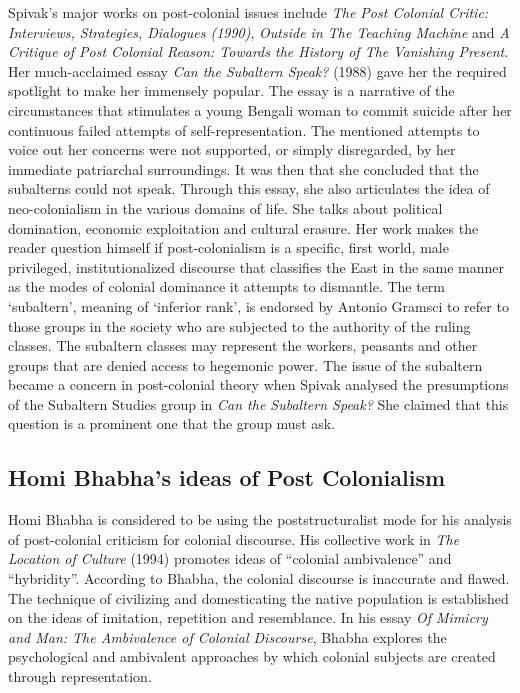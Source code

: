 Spivak’s major works on post-colonial issues include \emph{The Post Colonial Critic: Interviews, Strategies, Dialogues (1990)}, \emph{Outside in The Teaching Machine} and \emph{A Critique of Post Colonial Reason: Towards the History of The Vanishing Present}. Her much-acclaimed essay \emph{Can the Subaltern Speak?} (1988) gave her the required spotlight to make her immensely popular. The essay is a narrative of the circumstances that stimulates a young Bengali woman to commit suicide after her continuous failed attempts of self-representation. The mentioned attempts to voice out her concerns were not supported, or simply disregarded, by her immediate patriarchal surroundings. It was then that she concluded that the subalterns could not speak. Through this essay, she also articulates the idea of neo-colonialism in the various domains of life. She talks about political domination, economic exploitation and cultural erasure. Her work makes the reader question himself if post-colonialism is a specific, first world, male privileged, institutionalized discourse that classifies the East in the same manner as the modes of colonial dominance it attempts to dismantle. The term ‘subaltern’, meaning of ‘inferior rank’, is endorsed by Antonio Gramsci to refer to those groups in the society who are subjected to the authority of the ruling classes. The subaltern classes may represent the workers, peasants and other groups that are denied access to hegemonic power. The issue of the subaltern became a concern in post-colonial theory when Spivak analysed the presumptions of the Subaltern Studies group in \emph{Can the Subaltern Speak?} She claimed that this question is a prominent one that the group must ask.

\subsection{Homi Bhabha’s ideas of Post Colonialism}

Homi Bhabha is considered to be using the poststructuralist mode for his analysis of post-colonial criticism for colonial discourse. His collective work in \emph{The Location of Culture} (1994) promotes ideas of ``colonial ambivalence'' and ``hybridity''. According to Bhabha, the colonial discourse is inaccurate and flawed. The technique of civilizing and domesticating the native population is established on the ideas of imitation, repetition and resemblance. In his essay \emph{Of Mimicry and Man: The Ambivalence of Colonial Discourse}, Bhabha explores the psychological and ambivalent approaches by which colonial subjects are created through representation.

